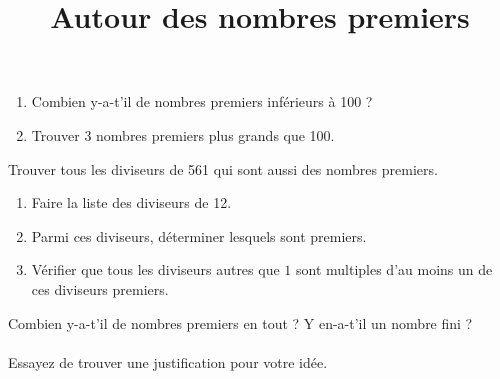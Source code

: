 \documentclass[a4paper,12pt]{article}
\title{Autour des nombres premiers}
\date{}
\author{}
\begin{document}
\maketitle

\begin{exercice}
	\begin{enumerate}
		\item Combien y-a-t'il de nombres premiers inférieurs à 100 ?
		\item Trouver 3 nombres premiers plus grands que 100.
	\end{enumerate}
\end{exercice}

\begin{exercice}
	Trouver tous les diviseurs de 561 qui sont aussi des nombres premiers.
\end{exercice}

\begin{exercice}
	\begin{enumerate}
		\item Faire la liste des diviseurs de 12.
		\item Parmi ces diviseurs, déterminer lesquels sont premiers.
		\item Vérifier que tous les diviseurs autres que $1$ sont multiples d'au moins un de ces diviseurs premiers.
	\end{enumerate}
\end{exercice}

\begin{exercice}[(avancé)]
	Combien y-a-t'il de nombres premiers en tout ? Y en-a-t'il un nombre fini ? \\ \\
	Essayez de trouver une justification pour votre idée.
\end{exercice}
\end{document}
